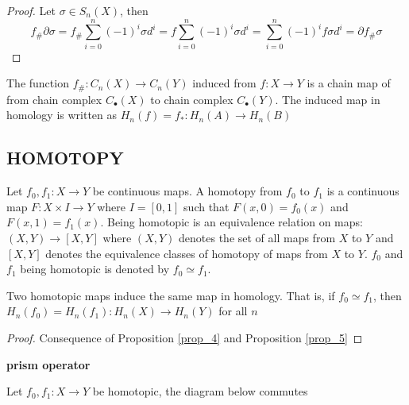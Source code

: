 \documentclass{report}
\begin{document}
\begin{proof}
    Let $\sigma \in S_n(X)$, then 
    $$
        f_\# \partial \sigma = f_\# \sum_{i=0}^n (-1)^i \sigma d^i = f \sum_{i=0}^n (-1)^i \sigma d^i = \sum_{i=0}^n (-1)^i f \sigma d^i = \partial f_\# \sigma
    $$
\end{proof}

\begin{remark}
    The function $f_\#: C_n(X) \to C_n(Y)$ induced from $f: X \to Y$ is a chain map of from chain complex $C_\bullet(X)$ to chain complex $C_\bullet(Y)$. The induced map in homology is written as $H_n(f) = f_*: H_n(A) \to H_n(B)$
\end{remark}

\subsection{HOMOTOPY}

\begin{definition}[homotopy]
    Let $f_0, f_1: X \to Y$ be continuous maps. A homotopy from $f_0$ to $f_1$ is a continuous map $F: X \times I \to Y$ where $I = [0, 1]$ such that $F(x, 0) = f_0(x)$ and $F(x, 1) = f_1(x)$. Being homotopic is an equivalence relation on maps: $(X, Y) \to [X, Y]$ where $(X, Y)$ denotes the set of all maps from $X$ to $Y$ and $[X, Y]$ denotes the equivalence classes of homotopy of maps from $X$ to $Y$. $f_0$ and $f_1$ being homotopic is denoted by $f_0 \simeq f_1$.
\end{definition}

\begin{theorem}
    Two homotopic maps induce the same map in homology. That is, if $f_0 \simeq f_1$, then $H_n(f_0) = H_n(f_1): H_n(X) \to H_n(Y)$ for all $n$
\end{theorem}

\begin{proof}
    Consequence of Proposition \ref{prop_4} and Proposition \ref{prop_5}
\end{proof}

\textbf{prism operator}

Let $f_0, f_1: X \to Y$ be homotopic, the diagram below commutes

\begin{center}
\end{center}
\end{document}
